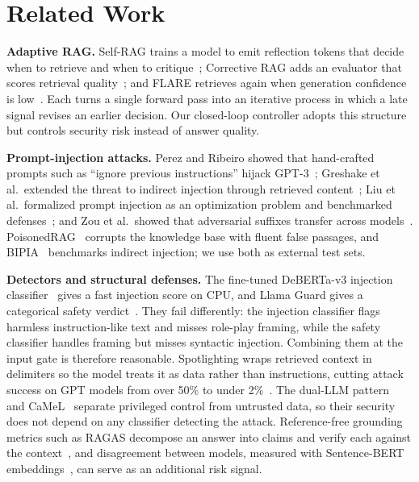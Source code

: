 \documentclass[conference]{IEEEtran}
\begin{document}
\section{Related Work}
\textbf{Adaptive RAG.} Self-RAG trains a model to emit reflection tokens that decide when to retrieve and when to critique~\cite{asai2024selfrag}; Corrective RAG adds an evaluator that scores retrieval quality~\cite{yan2024crag}; and FLARE retrieves again when generation confidence is low~\cite{jiang2023flare}. Each turns a single forward pass into an iterative process in which a late signal revises an earlier decision. Our closed-loop controller adopts this structure but controls security risk instead of answer quality.

\textbf{Prompt-injection attacks.} Perez and Ribeiro showed that hand-crafted prompts such as ``ignore previous instructions'' hijack GPT-3~\cite{perez2022}; Greshake et al.\ extended the threat to indirect injection through retrieved content~\cite{greshake2023}; Liu et al.\ formalized prompt injection as an optimization problem and benchmarked defenses~\cite{liu2024formalizing}; and Zou et al.\ showed that adversarial suffixes transfer across models~\cite{zou2023}. PoisonedRAG~\cite{zou2025poisonedrag} corrupts the knowledge base with fluent false passages, and BIPIA~\cite{yi2023bipia} benchmarks indirect injection; we use both as external test sets.

\textbf{Detectors and structural defenses.} The fine-tuned DeBERTa-v3 injection classifier~\cite{he2021debertav3,protectai2024} gives a fast injection score on CPU, and Llama Guard gives a categorical safety verdict~\cite{inan2023llamaguard}. They fail differently: the injection classifier flags harmless instruction-like text and misses role-play framing, while the safety classifier handles framing but misses syntactic injection. Combining them at the input gate is therefore reasonable. Spotlighting wraps retrieved context in delimiters so the model treats it as data rather than instructions, cutting attack success on GPT models from over 50\% to under 2\%~\cite{hines2024spotlighting}. The dual-LLM pattern~\cite{willison2023dual} and CaMeL~\cite{debenedetti2025camel} separate privileged control from untrusted data, so their security does not depend on any classifier detecting the attack. Reference-free grounding metrics such as RAGAS decompose an answer into claims and verify each against the context~\cite{es2023ragas}, and disagreement between models, measured with Sentence-BERT embeddings~\cite{reimers2019sbert}, can serve as an additional risk signal.
\end{document}
